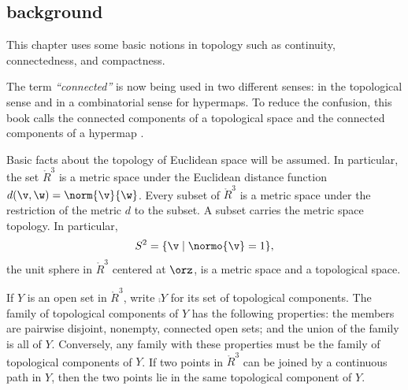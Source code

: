 \subsection{background}

This chapter uses some basic
notions in topology such as continuity, connectedness, and compactness.

\begin{remark} The term {\it ``connected''} is now being used in two
different senses: in the topological sense and in a combinatorial
sense for hypermaps.  To reduce the confusion, this book calls the
connected components of a topological space  and the connected components of a hypermap
.
\end{remark}
%
%
%


Basic facts about the topology of Euclidean space will be assumed.  In
particular, the set $\ring{R}^3$ is a metric space under the Euclidean
distance function $d(\v,\w) = \norm{\v}{\w}$.  Every subset of
$\ring{R}^3$ is a metric space under the restriction of the metric $d$
to the subset.  A subset carries the metric space topology.  In
particular, \begin{displaymath}S^2 = \{ \v \mid \normo{ \v} =
1\},\end{displaymath} the unit sphere in $\ring{R}^3$ centered at
$\orz$, is a metric space and a topological space.

If $Y$ is an open set in $\ring{R}^3$, write
$\comp{Y}$ for its set of topological components.
%
The family of topological components of $Y$ has the following properties:
the members are pairwise disjoint, nonempty, connected open sets; and the
union of the family is all of $Y$.
Conversely, any family with these properties must be the
family of topological components of $Y$.
If two
points in $\ring{R}^3$ 
can be joined by a continuous path in $Y$,
then the two points lie in the same topological component of $Y$.
%
%
%








